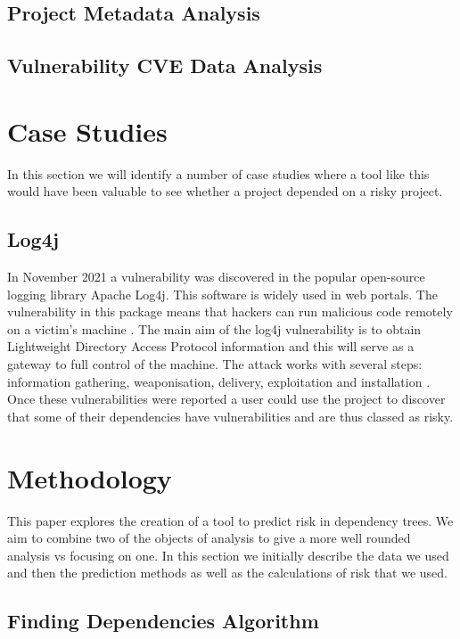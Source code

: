 \documentclass[10pt, onecolumn, compsoc, conference]{IEEEtran}
\begin{document}
\subsection{Project Metadata Analysis}


\subsection{Vulnerability CVE Data Analysis}
\section{Case Studies}
In this section we will identify a number of case studies where a tool like this would have been valuable to see whether a project depended on a risky project. 

\subsection{Log4j}
In November 2021 a vulnerability was discovered in the popular open-source logging library Apache Log4j. This software is widely used in web portals. The vulnerability in this package means that hackers can run malicious code remotely on a victim's machine \cite{h_gupta_identification_2022}. The main aim of the log4j vulnerability is to obtain Lightweight Directory Access Protocol information and this will serve as a gateway to full control of the machine. The attack works with several steps: information gathering, weaponisation, delivery, exploitation and installation \cite{f_maulana_unmasking_2023}. Once these vulnerabilities were reported a user could use the project to discover that some of their dependencies have vulnerabilities and are thus classed as risky. 


\section{Methodology}
This paper explores the creation of a tool to predict risk in dependency trees. We aim to combine two of the objects of analysis to give a more well rounded analysis vs focusing on one. In this section we initially describe the data we used and then the prediction methods as well as the calculations of risk that we used. 

\subsection{Finding Dependencies Algorithm}
\end{document}
